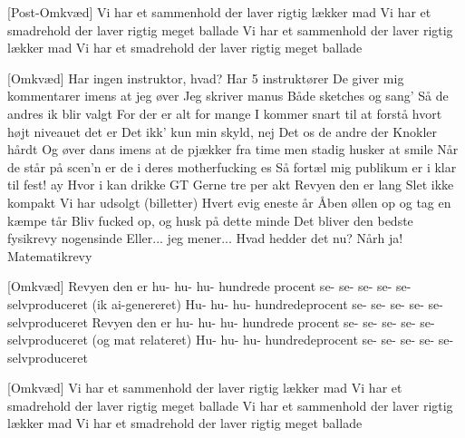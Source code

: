 \documentclass[a4paper,11pt]{article}
\begin{document}
\begin{song}
[Post-Omkvæd]
Vi har et sammenhold der laver rigtig lækker mad
Vi har et smadrehold der laver rigtig meget ballade
Vi har et sammenhold der laver rigtig lækker mad
Vi har et smadrehold der laver rigtig meget ballade

[Omkvæd]
Har ingen instruktor, hvad?
Har 5 instruktører
De giver mig kommentarer
imens at jeg øver
Jeg skriver manus
Både sketches og sang'
Så de andres ik blir valgt 
For der er alt for mange
I kommer snart til at forstå hvort højt niveauet det er
Det ikk' kun min skyld, nej
Det os de andre der
Knokler hårdt
Og øver dans imens at de pjækker fra time
men stadig husker at smile
Når de står på scen'n
er de i deres motherfucking es
Så fortæl mig publikum er i klar til fest! ay
Hvor i kan drikke GT
Gerne tre per akt
Revyen den er lang
Slet ikke kompakt
Vi har udsolgt (billetter)
Hvert evig eneste år
Åben øllen op
og tag en kæmpe tår
Bliv fucked op, og husk på dette minde
Det bliver den bedste fysikrevy nogensinde
Eller... jeg mener...
Hvad hedder det nu?
Nårh ja!
Matematikrevy

[Omkvæd] 
Revyen den er hu- hu- hu- hundrede procent
se- se- se- se- se- selvproduceret (ik ai-genereret)
Hu- hu- hu- hundredeprocent
se- se- se- se- se- selvproduceret
Revyen den er hu- hu- hu- hundrede procent
se- se- se- se- se- selvproduceret (og mat relateret)
Hu- hu- hu- hundredeprocent
se- se- se- se- se- selvproduceret

[Omkvæd]
Vi har et sammenhold der laver rigtig lækker mad
Vi har et smadrehold der laver rigtig meget ballade
Vi har et sammenhold der laver rigtig lækker mad
Vi har et smadrehold der laver rigtig meget ballade


\end{song}
\end{document}

